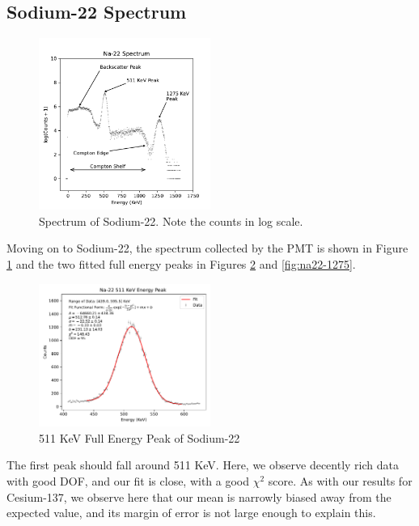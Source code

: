 \documentclass[12pt, letterpaper]{article}
\begin{document}
\subsection{Sodium-22 Spectrum}

\begin{figure}[!h]
    \centering
    \includegraphics[width=0.5\textwidth]{experiment1/figures/na22/spectrum.pdf}
    \caption{Spectrum of Sodium-22. Note the counts in log scale. }
    \label{fig:na22-spectrum}
\end{figure}

Moving on to Sodium-22, the spectrum collected by the PMT is shown in Figure \ref{fig:na22-spectrum} and the two fitted full energy peaks in Figures \ref{fig:na22-511} and \ref{fig:na22-1275}. 

\begin{figure}[!h]
    \centering
    \includegraphics[width=0.5\textwidth]{experiment1/figures/na22/peak-511.pdf}
    \caption{511 KeV Full Energy Peak of Sodium-22}
    \label{fig:na22-511}
\end{figure}

The first peak should fall around 511 KeV. Here, we observe decently rich data with good DOF, and our fit is close, with a good $\chi^2$ score. As with our results for Cesium-137, we observe here that our mean is narrowly biased away from the expected value, and its margin of error is not large enough to explain this. 
\end{document}
